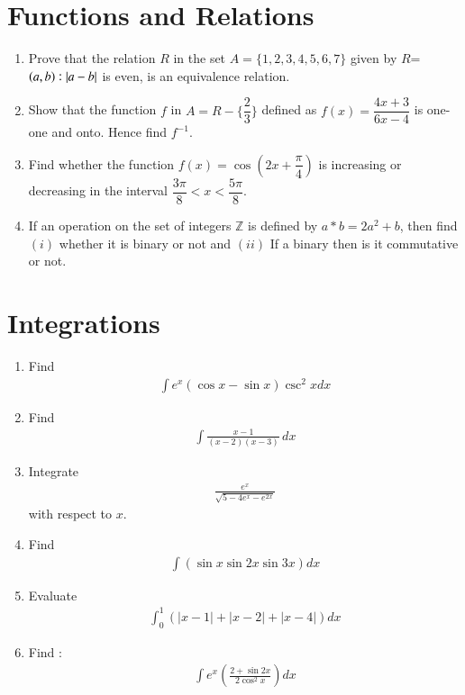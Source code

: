 \documentclass[12pt,-letter paper]{article}
\providecommand{\brak}[1]{\ensuremath{\left(#1\right)}}
\begin{document}
\section{Functions and Relations}

\begin{enumerate}

	\item Prove that the relation $R$ in the set $A=\{1,2,3,4,5,6,7\}$ given by $R$=$\brak{a,b} : \abs{a-b}$ is even, is an equivalence relation.

\item Show that the function $f$ in $A=R-\{\dfrac{2}{3}\}$ defined as $f(x)=\dfrac{4x+3}{6x-4}$ is one-one and onto. Hence find $f^{-1}$. 

\item Find whether the function $f(x)=\cos\brak{2x+\dfrac{\pi}{4}}$ is increasing or decreasing in the interval $\dfrac{3\pi}{8}<x<\dfrac{5\pi}{8}$.

\item If an operation on the set of integers $\mathbb{Z}$ is defined by $a*b=2a^2+b$, then find $(i)$ whether it is binary or not and $(ii)$ If a binary  then is it commutative or not.

\end{enumerate}

\section{Integrations}

\begin{enumerate}

\item Find \begin{align*}\int e^x\brak{\cos x-\sin x}\csc^2 x dx\end{align*}

\item Find \begin{align*}\int \frac{x-1}{(x-2)(x-3)}\,dx\end{align*}

\item Integrate \begin{align*}\frac{e^x}{\sqrt{5-4e^x-e^{2x}}}\end{align*} with respect to $x$.

\item Find \begin{align*}\int \brak{\sin x \sin 2x \sin 3x} dx\end{align*}

\item Evaluate \begin{align*}\int_{0}^{1}\brak{|x-1|+|x-2|+|x-4|} dx\end{align*}

\item Find :
\begin{align*}
\int{e^x\left(\frac{2+\sin 2x}{2\cos^2 x}\right) dx}
\end{align*}

\end{enumerate}
\end{document}
